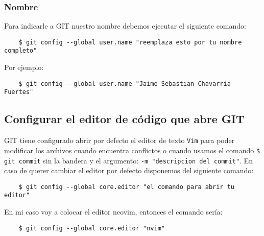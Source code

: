             \subsubsection{Nombre}
                Para indicarle a GIT nuestro nombre debemos ejecutar el siguiente comando:
                    \begin{lstlisting}
    $ git config --global user.name "reemplaza esto por tu nombre completo"
                    \end{lstlisting}
                Por ejemplo:
                    \begin{lstlisting}
    $ git config --global user.name "Jaime Sebastian Chavarria Fuertes"
                    \end{lstlisting}

    \subsection{Configurar el editor de c\'odigo que abre GIT}
        GIT tiene configurado abrir por defecto el editor de texto \texttt{Vim} para poder modificar los archivos cuando encuentra conflictos o cuando usamos el comando \texttt{\$ git commit} sin la bandera y el argumento: \texttt{-m "descripcion del commit"}.
        En caso de querer cambiar el editor por defecto disponemos del siguiente comando:
            \begin{lstlisting}
    $ git config --global core.editor "el comando para abrir tu editor"
            \end{lstlisting}
        En mi caso voy a colocar el editor neovim, entonces el comando ser\'ia:
            \begin{lstlisting}
    $ git config --global core.editor "nvim"
            \end{lstlisting}
    
